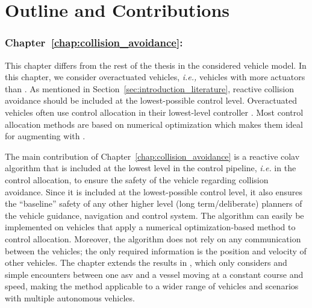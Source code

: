 \vspace*{-0.25em}
\section{Outline and Contributions}
\vspace*{-0.5em}

\subsubsection{Chapter~\ref{chap:collision_avoidance}: }

This chapter differs from the rest of the thesis in the considered vehicle model.
In this chapter, we consider overactuated vehicles, \emph{i.e.,} vehicles with more actuators than .
As mentioned in Section~\ref{sec:introduction_literature}, reactive collision avoidance should be included at the lowest-possible control level.
Overactuated vehicles often use control allocation in their lowest-level controller \cite{johansen_control_2013}.
Most control allocation methods are based on numerical optimization \cite{oppenheimer_control_2006,harkegard_dynamic_2004,johansen_constrained_2004} which makes them ideal for augmenting with .

The main contribution of Chapter~\ref{chap:collision_avoidance} is a reactive \acrfull{colav} algorithm that is included at the lowest level in the control pipeline, \emph{i.e.} in the control allocation, to ensure the safety of the vehicle regarding collision avoidance.
Since it is included at the lowest-possible control level, it also ensures the ``baseline'' safety of any other higher level (long term/deliberate) planners of the vehicle guidance, navigation and control system.
The algorithm can easily be implemented on vehicles that apply a numerical optimization-based method to control allocation.
Moreover, the algorithm does not rely on any communication between the vehicles; the only required information is the position and velocity of other vehicles.
The chapter extends the results in \cite{thyri_reactive_2020}, which only considers  and simple encounters between one \gls{asv} and a vessel moving at a constant course and speed, making the method applicable to a wider range of vehicles and scenarios with multiple autonomous vehicles.


